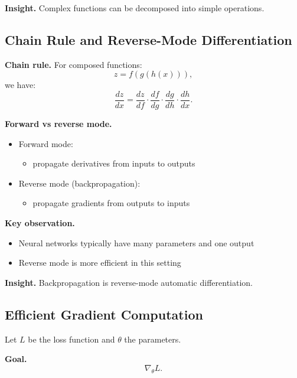 \medskip

\noindent
\textbf{Insight.}  
Complex functions can be decomposed into simple operations.

\subsection{Chain Rule and Reverse-Mode Differentiation}

\textbf{Chain rule.}  
For composed functions:
\[
z = f(g(h(x))),
\]
we have:
\[
\frac{dz}{dx} = \frac{dz}{df} \cdot \frac{df}{dg} \cdot \frac{dg}{dh} \cdot \frac{dh}{dx}.
\]

\medskip

\noindent
\textbf{Forward vs reverse mode.}

\begin{itemize}
    \item Forward mode:
    \begin{itemize}
        \item propagate derivatives from inputs to outputs
    \end{itemize}

    \item Reverse mode (backpropagation):
    \begin{itemize}
        \item propagate gradients from outputs to inputs
    \end{itemize}
\end{itemize}

\medskip

\noindent
\textbf{Key observation.}
\begin{itemize}
    \item Neural networks typically have many parameters and one output
    \item Reverse mode is more efficient in this setting
\end{itemize}

\medskip

\noindent
\textbf{Insight.}  
Backpropagation is reverse-mode automatic differentiation.

\subsection{Efficient Gradient Computation}

Let $L$ be the loss function and $\theta$ the parameters.

\medskip

\noindent
\textbf{Goal.}
\[
\nabla_\theta L.
\]

